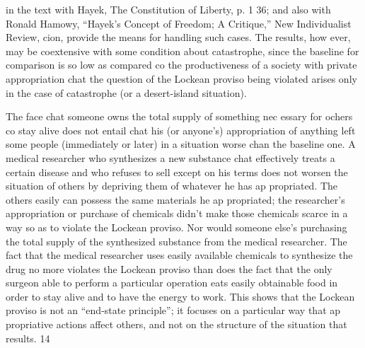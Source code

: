 \documentclass[11pt,openany]{book}
\begin{document}
in the text with Hayek, The Constitution of Liberty, p. 1 36; and also with Ronald Hamowy, ``Hayek's Concept of Freedom; A Critique,'' New Individualist Review, cion, provide the means for handling such cases. The results, how ever, may be coextensive with some condition about catastrophe, since the baseline for comparison is so low as compared co the productiveness of a society with private appropriation chat the question of the Lockean proviso being violated arises only in the case of catastrophe (or a desert-island situation). 

The face chat someone owns the total supply of something nec essary for ochers co stay alive does not entail chat his (or anyone's) appropriation of anything left some people (immediately or later) in a situation worse chan the baseline one. A medical researcher who synthesizes a new substance chat effectively treats a certain disease and who refuses to sell except on his terms does not worsen the situation of others by depriving them of whatever he has ap propriated. The others easily can possess the same materials he ap propriated; the researcher's appropriation or purchase of chemicals didn't make those chemicals scarce in a way so as to violate the Lockean proviso. Nor would someone else's purchasing the total supply of the synthesized substance from the medical researcher. The fact that the medical researcher uses easily available chemicals to synthesize the drug no more violates the Lockean proviso than does the fact that the only surgeon able to perform a particular operation eats easily obtainable food in order to stay alive and to have the energy to work. This shows that the Lockean proviso is not an ``end-state principle''; it focuses on a particular way that ap propriative actions affect others, and not on the structure of the situation that results. 14 
\end{document}
